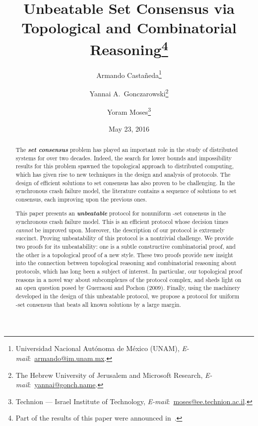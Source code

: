 \documentclass[11pt]{article}
\theoremstyle{definition}
\newcommand{\defemph}[1]{\textbf{\textit{#1}}}
\begin{document}
\title{Unbeatable Set Consensus via \\ Topological and Combinatorial Reasoning\thanks{
Part of the results of this paper
were announced
in~\cite{AYY-PODC-BA}.
}}

\author{Armando Casta\~{n}eda\thanks{Universidad Nacional Aut\'onoma de M\'exico (UNAM), \mbox{\emph{E-mail}: \href{mailto:armando@im.unam.mx}{armando@im.unam.mx}}.}
\and Yannai A.~Gonczarowski\thanks{The Hebrew University of Jerusalem and Microsoft Research, \mbox{\emph{E-mail}: \href{mailto:yannai@gonch.name}{yannai@gonch.name}}.}
\and Yoram Moses\thanks{Technion --- Israel Institute of Technology, \mbox{\emph{E-mail}: \href{mailto:moses@ee.technion.ac.il}{moses@ee.technion.ac.il}}.}}

\date{May 23, 2016}

\maketitle
\begin{abstract}
The \defemph{set consensus} problem has played an important role in the study of distributed systems for over two decades. Indeed, the search for lower bounds and impossibility results for this problem  spawned the topological approach to distributed computing, which has given rise to new techniques in the design and analysis of protocols. The design of efficient solutions to set consensus has also proven to be challenging.
In the synchronous crash failure model, the literature contains a sequence of solutions to set consensus, each improving upon the previous ones.

This paper presents an \defemph{unbeatable} protocol for nonuniform -set consensus in the synchronous crash failure model.
This is an efficient protocol whose decision times \emph{cannot} be improved upon.
Moreover, the description of our protocol is extremely succinct.
Proving unbeatability of this protocol is a nontrivial challenge.
We provide two proofs for its unbeatability: one is a subtle constructive combinatorial proof, and the other is a topological proof of a new style.
These two proofs provide new insight into the connection between  topological reasoning and combinatorial reasoning about protocols, which has long been a subject of interest. In particular, our topological proof  reasons in a novel way about subcomplexes of the protocol complex, and sheds light on an open question posed by Guerraoui and Pochon (2009).
Finally, using the machinery developed in the design of this unbeatable protocol, we propose a protocol for uniform -set consensus that beats all known solutions by a large margin.

\end{abstract}
\end{document}
